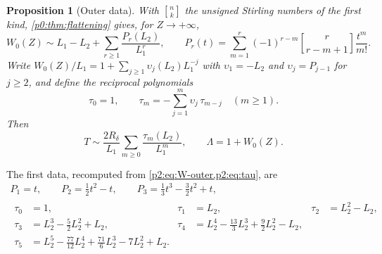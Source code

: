 \documentclass[11pt,a4paper,oneside]{book}
\theoremstyle{plain}
\newtheorem{proposition}[theorem]{Proposition}
\theoremstyle{definition}
\theoremstyle{remark}
\newcommand{\Wlam}{W}
\newcommand{\stirlingfirst}[2]{\genfrac{[}{]}{0pt}{}{#1}{#2}}
\begin{document}
\begin{proposition}[Outer data]
\label{p2:prop:outer-data}
With \(\stirlingfirst{n}{k}\) the unsigned Stirling numbers of the first kind,
\cref{p0:thm:flattening} gives, for \(Z\to+\infty\),
\begin{equation}
 \Wlam_0(Z)\sim L_1-L_2+\sum_{r\ge1}\frac{P_r(L_2)}{L_1^r},
 \qquad
 P_r(t)=\sum_{m=1}^{r}(-1)^{r-m}\stirlingfirst{r}{r-m+1}\frac{t^m}{m!} .
 \label{p2:eq:W-outer}
\end{equation}
Write \(\Wlam_0(Z)/L_1=1+\sum_{j\ge1}\upsilon_j(L_2)L_1^{-j}\) with
\(\upsilon_1=-L_2\) and \(\upsilon_j=P_{j-1}\) for \(j\ge2\), and define the
reciprocal polynomials
\begin{equation}
 \tau_0=1,\qquad \tau_m=-\sum_{j=1}^{m}\upsilon_j\,\tau_{m-j}\quad(m\ge1).
 \label{p2:eq:tau}
\end{equation}
Then
\begin{equation}
 T\sim\frac{2R_\delta}{L_1}\sum_{m\ge0}\frac{\tau_m(L_2)}{L_1^m},
 \qquad
 \Lambda=1+\Wlam_0(Z) .
 \label{p2:eq:T-outer}
\end{equation}
\end{proposition}

The first data, recomputed from \cref{p2:eq:W-outer,p2:eq:tau}, are
\begin{gather}
 P_1=t,\qquad P_2=\tfrac12t^2-t,\qquad P_3=\tfrac13t^3-\tfrac32t^2+t,
 \label{p2:eq:P-first}\\[0.3em]
 \begin{aligned}
 \tau_0&=1, &\tau_1&=L_2, &\tau_2&=L_2^2-L_2,\\
 \tau_3&=L_2^3-\tfrac52L_2^2+L_2,
 &\tau_4&=L_2^4-\tfrac{13}3L_2^3+\tfrac92L_2^2-L_2,\\
 \tau_5&=L_2^5-\tfrac{77}{12}L_2^4+\tfrac{71}6L_2^3-7L_2^2+L_2. & &
 \end{aligned}
 \label{p2:eq:tau-first}
\end{gather}
\end{document}

